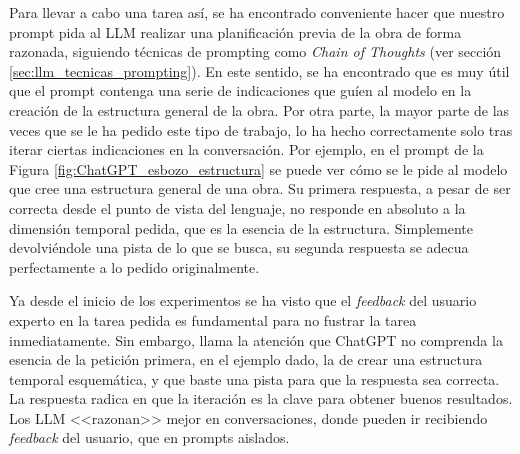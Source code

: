 Para llevar a cabo una tarea así, se ha encontrado conveniente hacer que nuestro prompt pida al LLM realizar una planificación previa de la obra de forma razonada, siguiendo técnicas de prompting como \textit{Chain of Thoughts} (ver sección \ref{sec:llm_tecnicas_prompting}). En este sentido, se ha encontrado que es muy útil que el prompt contenga una serie de indicaciones que guíen al modelo en la creación de la estructura general de la obra. Por otra parte, la mayor parte de las veces que se le ha pedido este tipo de trabajo, lo ha hecho correctamente solo tras iterar ciertas indicaciones en la conversación.  Por ejemplo, en el prompt de la Figura \ref{fig:ChatGPT_esbozo_estructura} se puede ver cómo se le pide al modelo que cree una estructura general de una obra. Su primera respuesta, a pesar de ser correcta desde el punto de vista del lenguaje, no responde en absoluto a la dimensión temporal pedida, que es la esencia de la estructura. Simplemente devolviéndole una pista de lo que se busca, su segunda respuesta se adecua perfectamente a lo pedido originalmente. 

Ya desde el inicio de los experimentos se ha visto que el \textit{feedback} del usuario experto en la tarea pedida es fundamental para no fustrar la tarea inmediatamente. Sin embargo, llama la atención que ChatGPT no comprenda la esencia de la petición primera, en el ejemplo dado, la de crear una estructura temporal esquemática, y que baste una pista para que la respuesta sea correcta. La respuesta radica en que la iteración es la clave para obtener buenos resultados. Los LLM <<razonan>> mejor en conversaciones, donde pueden ir recibiendo \textit{feedback} del usuario, que en prompts aislados.


